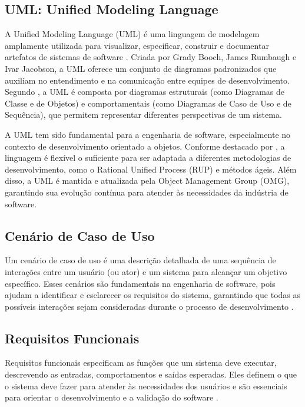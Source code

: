 \subsection{UML: Unified Modeling Language}
A Unified Modeling Language (UML) é uma linguagem de modelagem amplamente utilizada para visualizar, especificar, construir e documentar artefatos de sistemas de software \citep{Booch2005}. Criada por Grady Booch, James Rumbaugh e Ivar Jacobson, a UML oferece um conjunto de diagramas padronizados que auxiliam no entendimento e na comunicação entre equipes de desenvolvimento. Segundo \cite{Booch2005}, a UML é composta por diagramas estruturais (como Diagramas de Classe e de Objetos) e comportamentais (como Diagramas de Caso de Uso e de Sequência), que permitem representar diferentes perspectivas de um sistema.

A UML tem sido fundamental para a engenharia de software, especialmente no contexto de desenvolvimento orientado a objetos. Conforme destacado por \cite{Fowler2005}, a linguagem é flexível o suficiente para ser adaptada a diferentes metodologias de desenvolvimento, como o Rational Unified Process (RUP) e métodos ágeis. Além disso, a UML é mantida e atualizada pela Object Management Group (OMG), garantindo sua evolução contínua para atender às necessidades da indústria de software.

\subsection{Cenário de Caso de Uso}
Um cenário de caso de uso é uma descrição detalhada de uma sequência de interações entre um usuário (ou ator) e um sistema para alcançar um objetivo específico. Esses cenários são fundamentais na engenharia de software, pois ajudam a identificar e esclarecer os requisitos do sistema, garantindo que todas as possíveis interações sejam consideradas durante o processo de desenvolvimento \citep{pressman2021engenharia}.

\subsection{Requisitos Funcionais}
Requisitos funcionais especificam as funções que um sistema deve executar, descrevendo as entradas, comportamentos e saídas esperadas. Eles definem o que o sistema deve fazer para atender às necessidades dos usuários e são essenciais para orientar o desenvolvimento e a validação do software \citep{pressman2021engenharia}.

